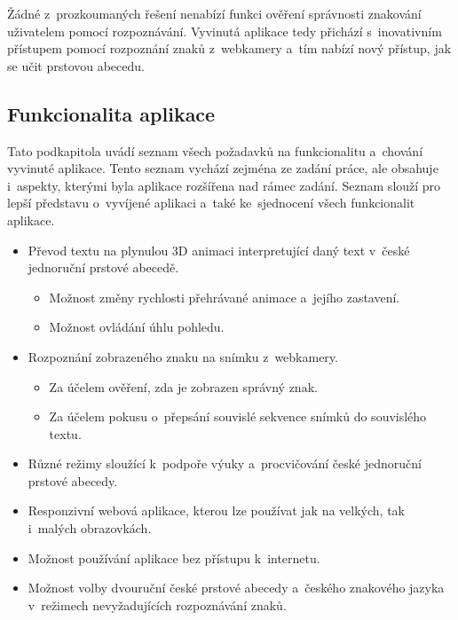 \documentclass[
  master,
  program=ainfvs,
  biblatex,
  figures=true,
  tables=false,
  sourcecodes=true,
  glossaries,
  index
]{kidiplom}
\begin{document}
         Žádné z~prozkoumaných řešení nenabízí funkci ověření správnosti znakování uživatelem pomocí rozpoznávání. Vyvinutá aplikace tedy přichází s~inovativním přístupem pomocí rozpoznání znaků z~webkamery a~tím nabízí nový přístup, jak se učit prstovou abecedu.

     \subsection{Funkcionalita aplikace}
       Tato podkapitola uvádí seznam všech požadavků na funkcionalitu a~chování vyvinuté aplikace. Tento seznam vychází zejména ze zadání práce, ale obsahuje i~aspekty, kterými byla aplikace rozšířena nad rámec zadání. Seznam slouží pro lepší představu o~vyvíjené aplikaci a~také ke~sjednocení všech funkcionalit aplikace.

        \begin{itemize}
            \item Převod textu na plynulou 3D animaci interpretující daný text v~české jednoruční prstové abecedě.
            \begin{itemize}
                \item Možnost změny rychlosti přehrávané animace a~jejího zastavení.
                \item Možnost ovládání úhlu pohledu.
            \end{itemize}
            
            \item Rozpoznání zobrazeného znaku na snímku z~webkamery.
            
            \begin{itemize}
                \item Za účelem ověření, zda je zobrazen správný znak.
                \item Za účelem pokusu o~přepsání souvislé sekvence snímků do souvislého textu.
            \end{itemize}
            
            \item Různé režimy sloužící k~podpoře výuky a~procvičování české jednoruční prstové abecedy.
            
            \item Responzivní webová aplikace, kterou lze používat jak na velkých, tak i~malých obrazovkách.
            
            \item Možnost používání aplikace bez přístupu k~internetu.
            
            \item Možnost volby dvouruční české prstové abecedy a~českého znakového jazyka v~režimech nevyžadujících rozpoznávání znaků.
        \end{itemize}
\end{document}
